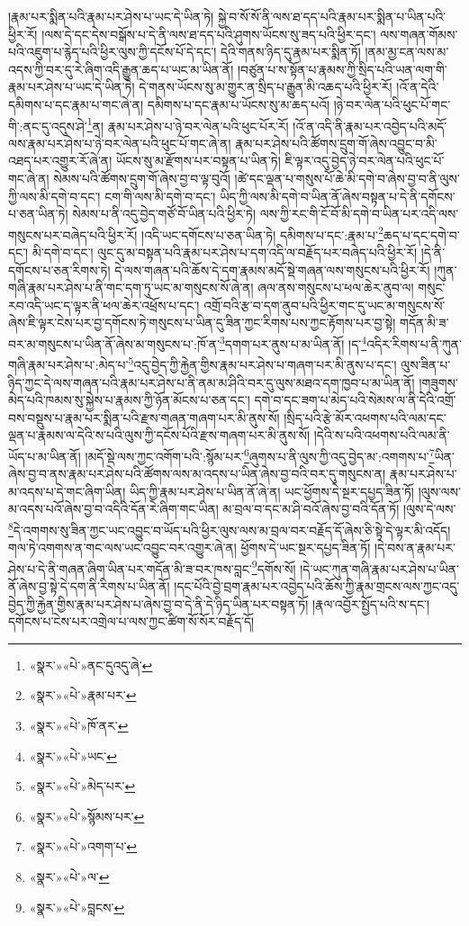 །རྣམ་པར་སྨིན་པའི་རྣམ་པར་ཤེས་པ་ཡང་དེ་ཡིན་ཏེ། སྐྱེ་བ་སོ་སོ་ནི་ལས་ཐ་དད་པའི་རྣམ་པར་སྨིན་པ་ཡིན་པའི་ཕྱིར་རོ། །ལས་དེ་དང་དེས་བསྒོས་པ་དེ་ནི་ལས་ཐ་དད་པའི་ཤུགས་ཡོངས་སུ་ཟད་པའི་ཕྱིར་དང་། ལས་གཞན་གོམས་པའི་འཇུག་པ་རྙེད་པའི་ཕྱིར་ལུས་ཀྱི་དངོས་པོ་དེ་དང་། དེའི་གནས་ཉིད་དུ་རྣམ་པར་སྨིན་ཏོ། །ནམ་མྱ་ངན་ལས་མ་འདས་ཀྱི་བར་དུ་རེ་ཞིག་འདི་རྒྱུན་ཆད་པ་ཡང་མ་ཡིན་ནོ། །བཙུན་པ་ས་སྟོན་པ་རྣམས་ཀྱི་སྲིད་པའི་ཡན་ལག་གི་རྣམ་པར་ཤེས་པ་ཡང་དེ་ཡིན་ཏེ། དེ་གནས་ཡོངས་སུ་མ་གྱུར་ན་སྲིད་པ་རྒྱུན་མི་འཆད་པའི་ཕྱིར་རོ། །འོ་ན་དེའི་དམིགས་པ་དང་རྣམ་པ་གང་ཞེ་ན། དམིགས་པ་དང་རྣམ་པ་ཡོངས་སུ་མ་ཆད་པའོ། །ཉེ་བར་ལེན་པའི་ཕུང་པོ་གང་གི་:ནང་དུ་འདུས་ཤེ་\footnote{«སྣར་»«པེ་»ནང་དུའདུ་ཞེ་}ན། རྣམ་པར་ཤེས་པ་ཉེ་བར་ལེན་པའི་ཕུང་པོར་རོ། །འོ་ན་འདི་ནི་རྣམ་པར་འབྱེད་པའི་མདོ་ལས་རྣམ་པར་ཤེས་པ་ཉེ་བར་ལེན་པའི་ཕུང་པོ་གང་ཞེ་ན། རྣམ་པར་ཤེས་པའི་ཚོགས་དྲུག་གོ་ཞེས་འབྱུང་བ་མི་འཐད་པར་འགྱུར་རོ་ཞེ་ན། ཡོངས་སུ་མ་རྫོགས་པར་བསྟན་པ་ཡིན་ཏེ། ཇི་ལྟར་འདུ་བྱེད་ཉེ་བར་ལེན་པའི་ཕུང་པོ་གང་ཞེ་ན། སེམས་པའི་ཚོགས་དྲུག་གོ་ཞེས་བྱ་བ་ལྟ་བུའོ། །ཚེ་དང་ལྡན་པ་གསུས་པོ་ཆེ་མི་དགེ་བ་ཞེས་བྱ་བ་ནི་ལུས་ཀྱི་ལས་མི་དགེ་བ་དང་། ངག་གི་ལས་མི་དགེ་བ་དང་། ཡིད་ཀྱི་ལས་མི་དགེ་བ་ཡིན་ནོ་ཞེས་བསྟན་པ་དེ་ནི་དགོངས་པ་ཅན་ཡིན་ཏེ། སེམས་པ་ནི་འདུ་བྱེད་གཙོ་བོ་ཡིན་པའི་ཕྱིར་ཏེ། ལས་ཀྱི་རང་གི་ངོ་བོ་མི་དགེ་བ་ཡིན་པར་འདི་ལས་གསུངས་པར་བཞེད་པའི་ཕྱིར་རོ། །འདི་ཡང་དགོངས་པ་ཅན་ཡིན་ཏེ། དམིགས་པ་དང་:རྣམ་པ་\footnote{«སྣར་»«པེ་»རྣམ་པར་}ཆད་པ་དང་དགེ་བ་དང་། མི་དགེ་བ་དང་། ལུང་དུ་མ་བསྟན་པའི་རྣམ་པར་ཤེས་པ་དག་འདི་ལ་བརྗོད་པར་བཞེད་པའི་ཕྱིར་རོ། །དེ་ནི་དགོངས་པ་ཅན་རིགས་ཏེ། དེ་ལས་གཞན་པའི་ཆོས་དེ་དག་རྣམས་མདོ་སྡེ་གཞན་ལས་གསུངས་པའི་ཕྱིར་རོ། །ཀུན་གཞི་རྣམ་པར་ཤེས་པ་ནི་གང་དག་ཏུ་ཡང་མ་གསུངས་སོ་ཞེ་ན། ཞལ་ནས་གསུངས་པ་ཕལ་ཆེར་ནུབ་ལ། གསུང་རབ་འདི་ཡང་ད་ལྟར་ནི་ཕལ་ཆེར་འཕྲོས་པ་དང་། འགྲོ་བའི་རྩ་བ་དག་ནུབ་པའི་ཕྱིར་གང་དུ་ཡང་མ་གསུངས་སོ་ཞེས་ཇི་ལྟར་ངེས་པར་བྱ་དགོངས་ཏེ་གསུངས་པ་ཡིན་དུ་ཟིན་ཀྱང་རིགས་པས་ཀྱང་རྟོགས་པར་བྱ་སྟེ། གདོན་མི་ཟ་བར་མ་གསུངས་པ་ཡིན་ནོ་ཞེས་མ་གསུངས་པ་:ཁོ་ན་\footnote{«སྣར་»«པེ་»ཁོ་ནར་}དགག་པར་ནུས་པ་མ་ཡིན་ནོ། །ད་\footnote{«སྣར་»«པེ་»ཡང་}འདིར་རིགས་པ་ནི་ཀུན་གཞི་རྣམ་པར་ཤེས་པ་:མེད་པ་\footnote{«སྣར་»«པེ་»མེད་པར་}འདུ་བྱེད་ཀྱི་རྐྱེན་གྱིས་རྣམ་པར་ཤེས་པ་གཞག་པར་མི་ནུས་པ་དང་། ལུས་ཟིན་པ་ཉིད་ཀྱང་དེ་ལས་གཞན་པའི་རྣམ་པར་ཤེས་པ་ནི་ནམ་མ་ཤིའི་བར་དུ་ལུས་མཐའ་དག་ཁྱབ་པ་མ་ཡིན་ནོ། །གཟུགས་མེད་པའི་ཁམས་སུ་སྐྱེས་པ་རྣམས་ཀྱི་ཉོན་མོངས་པ་ཅན་དང་། དགེ་བ་དང་ཟག་པ་མེད་པའི་སེམས་ལ་ནི་དེའི་འགྲོ་བས་བསྡུས་པ་རྣམ་པར་སྨིན་པའི་རྫས་གཞན་གཞག་པར་མི་ནུས་སོ། །སྲིད་པའི་རྩེ་མོར་འཕགས་པའི་ལམ་དང་ལྡན་པ་རྣམས་ལ་དེའི་ས་པའི་ལུས་ཀྱི་དངོས་པོའི་རྫས་གཞག་པར་མི་ནུས་སོ། །དེའི་ས་པའི་འཕགས་པའི་ལམ་ནི་ཡོད་པ་མ་ཡིན་ནོ། །མདོ་སྡེ་ལས་ཀྱང་འགོག་པའི་:སྙོམ་པར་\footnote{«སྣར་»«པེ་»སྙོམས་པར་}ཞུགས་པ་ནི་ལུས་ཀྱི་འདུ་བྱེད་མ་:འགགས་པ་\footnote{«སྣར་»«པེ་»འགག་པ་}ཡིན་ཞེས་བྱ་བ་ནས་རྣམ་པར་ཤེས་པའི་ཚོགས་ལས་མ་འདས་པ་ཡིན་ཞེས་བྱ་བའི་བར་དུ་གསུངས་ན། རྣམ་པར་ཤེས་པ་མ་འདས་པ་དེ་གང་ཞིག་ཡིན། ཡིད་ཀྱི་རྣམ་པར་ཤེས་པ་ཡིན་ནོ་ཞེ་ན། ཡང་ཕྱོགས་དེ་སྔར་དཔྱད་ཟིན་ཏོ། །ལུས་ལས་མ་འདས་པའོ་ཞེས་བྱ་བ་འདིའི་དོན་རེ་ཞིག་གང་ཡིན། མ་བྲལ་བ་དང་མ་ཤི་བའོ་ཞེས་བྱ་བའི་དོན་ཏོ། །ལུས་དེ་ལས་\footnote{«སྣར་»«པེ་»ལ་}དེ་འགགས་སུ་ཟིན་ཀྱང་ཡང་འབྱུང་བ་ཡོད་པའི་ཕྱིར་ལུས་ལས་མ་བྲལ་བར་བརྗོད་དོ་ཞེས་ཅི་སྟེ་དེ་ལྟར་མི་འདོད། གལ་ཏེ་འགགས་ན་གང་ལས་ཡང་འབྱུང་བར་འགྱུར་ཞེ་ན། ཕྱོགས་དེ་ཡང་སྔར་དཔྱད་ཟིན་ཏོ། །དེ་བས་ན་རྣམ་པར་ཤེས་པ་དེ་ནི་གཞན་ཞིག་ཡིན་པར་གདོན་མི་ཟ་བར་ཁས་བླང་\footnote{«སྣར་»«པེ་»བླངས་}དགོས་སོ། །དེ་ཡང་ཀུན་གཞི་རྣམ་པར་ཤེས་པ་ཡིན་ནོ་ཞེས་བྱ་སྟེ་དེ་དག་ནི་རིགས་པ་ཡིན་ནོ། །དང་པོའི་བྱེ་བྲག་རྣམ་པར་འབྱེད་པའི་ཆོས་ཀྱི་རྣམ་གྲངས་ལས་ཀྱང་འདུ་བྱེད་ཀྱི་རྐྱེན་གྱིས་རྣམ་པར་ཤེས་པ་ཞེས་བྱ་བ་དེ་ནི་དེ་ཉིད་ཡིན་པར་བསྟན་ཏོ། །རྣལ་འབྱོར་སྤྱོད་པའི་ས་དང་། དགོངས་པ་ངེས་པར་འགྲེལ་པ་ལས་ཀྱང་ཚིག་སོ་སོར་བརྗོད་དོ། 